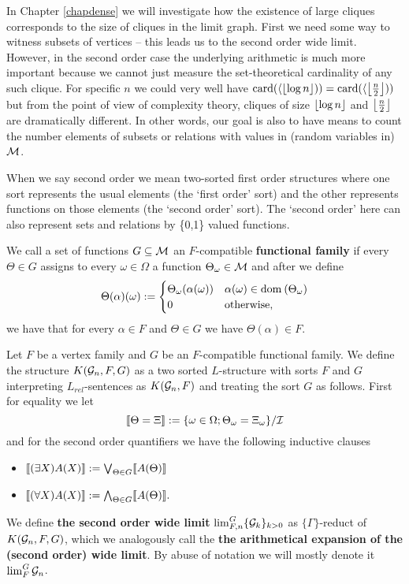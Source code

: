 In Chapter \ref{chapdense} we will investigate how the existence of large cliques corresponds to the size of cliques in the limit graph. First we need some way to witness subsets of vertices -- this leads us to the second order wide limit. However, in the second order case the underlying arithmetic is much more important because we cannot just measure the set-theoretical cardinality of any such clique. For specific $n$ we could very well have $\text{card}(\langle \left \lfloor {\log{n}} \right \rfloor))=\text{card}(\langle \left \lfloor {\frac{n}{2}} \right \rfloor))$ but from the point of view of complexity theory, cliques of size $\left \lfloor {\log n} \right \rfloor$ and $\left \lfloor {\frac{n}{2}} \right \rfloor$ are dramatically different. In other words, our goal is also to have means to count the number elements of subsets or relations with values in (random variables in) $\mathcal{M}$.

When we say second order we mean two-sorted first order structures where one sort represents the usual elements (the `first order' sort) and the other represents functions on those elements (the `second order' sort). The `second order' here can also represent sets and relations by \{0,1\} valued functions.

\begin{defi}
We call a set of functions $G\subseteq \mathcal{M}$ an $F$-compatible \textbf{functional family} if every $\Theta\in G$ assigns to every $\omega\in\Omega$ a function $\Theta_\omega\in\mathcal{M}$ and after we define
\[\Theta(\alpha)(\omega):=
\begin{cases}\Theta_\omega(\alpha(\omega))&\alpha(\omega)\in\text{dom}\:(\Theta_\omega)\\0&\text{otherwise,}
\end{cases}\]
we have that for every $\alpha \in F$ and $\Theta \in G$ we have $\Theta(\alpha)\in F$.
\end{defi}

\begin{defi}
Let $F$ be a vertex family and $G$ be an $F$-compatible functional family. We define the structure $K(\mathcal{G}_n,F,G)$ as a two sorted $L$-structure with sorts $F$ and $G$ interpreting $L_{rel}$-sentences as $K(\mathcal{G}_n,F)$ and treating the sort $G$ as follows. First for equality we let
\[\llbracket\Theta=\Xi \rrbracket := \{\omega\in \Omega;\Theta_\omega=\Xi_\omega\}/\mathcal{I}\]
and for the second order quantifiers we have the following inductive clauses
\begin{itemize}
\item $\llbracket(\exists X)A(X)\rrbracket:=\bigvee_{\Theta\in G}\llbracket A(\Theta)\rrbracket$
\item $\llbracket(\forall X)A(X)\rrbracket:=\bigwedge_{\Theta\in G}\llbracket A(\Theta)\rrbracket.$
\end{itemize}

We define \textbf{the second order wide limit} $\lim_{F,n}^G\{\mathcal{G}_k\}_{k>0}$ as $\{\Gamma\}$-reduct of $K(\mathcal{G}_n,F,G)$, which we analogously call the \textbf{the arithmetical expansion of the (second order) wide limit}. By abuse of notation we will mostly denote it $\lim_F^G\mathcal{G}_n$.
\end{defi}

